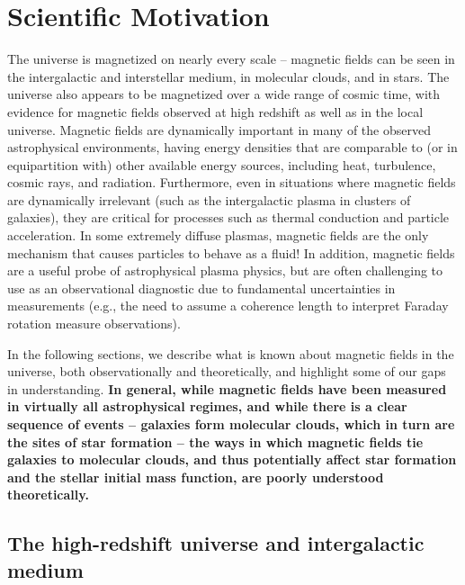 \vspace{-4mm}
\section{Scientific Motivation}
\label{sec:motivation}
\vspace{-3mm} 

The universe is magnetized on nearly every scale -- magnetic fields
can be seen in the intergalactic and interstellar medium, in
molecular clouds, and in stars.  The universe also appears to be
magnetized over a wide range of cosmic time, with evidence for
magnetic fields observed at high redshift as well as in the local
universe.  Magnetic fields are dynamically important in many of the
observed astrophysical environments, having energy densities that are
comparable to (or in equipartition with) other available energy
sources, including heat, turbulence, cosmic rays, and radiation.
Furthermore, even in situations where magnetic fields are dynamically
irrelevant (such as the intergalactic plasma in clusters of galaxies),
they are critical for processes such as thermal conduction and
particle acceleration.  In some extremely diffuse plasmas, magnetic
fields are the only mechanism that causes particles to behave as a
fluid!  In addition, magnetic fields are a useful probe of
astrophysical plasma physics, but are often challenging to use as an
observational diagnostic due to fundamental uncertainties in
measurements (e.g., the need to assume a coherence length to interpret
Faraday rotation measure observations).

In the following sections, we describe what is known about magnetic
fields in the universe, both observationally and theoretically, and
highlight some of our gaps in understanding.  \textbf{In general, while
magnetic fields have been measured in virtually all astrophysical
regimes, and while there is a clear sequence of events -- galaxies
form molecular clouds, which in turn are the sites of star formation
-- the ways in which magnetic fields tie galaxies to molecular clouds,
and thus potentially affect star formation and the stellar initial
mass function, are poorly understood theoretically.}

\vspace{-3mm}
\subsection{The high-redshift universe and intergalactic medium}
\label{sec:extragalactic}
\vspace{-2mm}

